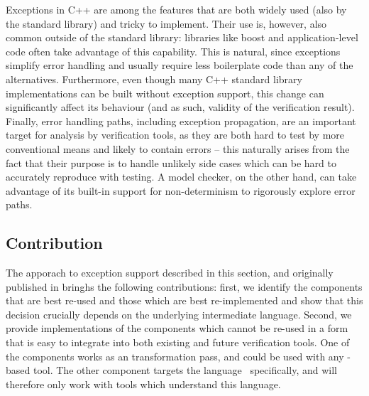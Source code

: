 Exceptions in C++ are among the features that are both widely used (also by the standard library) and tricky to implement.
Their use is, however, also common outside of the standard library: libraries
like boost
and application-level code often take advantage of this capability.
This is natural, since exceptions simplify error handling and usually require
less boilerplate code than any of the alternatives.
Furthermore, even though many C++ standard library implementations can
be built without exception support, this change can significantly affect its behaviour
(and as such, validity of the verification result).
Finally, error handling paths, including exception propagation, are an
important target for analysis by verification tools, as they are both hard to
test by more conventional means and likely to contain errors -- this naturally
arises from the fact that their purpose is to handle unlikely side cases which
can be hard to accurately reproduce with testing.
A model checker, on the other hand, can take advantage of its built-in support
for non-determinism to rigorously explore error paths.

\subsection{Contribution}\label{contribution}

The apporach to exception support described in this section, and originally published in  bringhs the following contributions:
first, we identify the
components that are best re-used and those which are best re-implemented
and show that this decision crucially depends on the underlying
intermediate language. Second, we provide implementations of the
components which cannot be re-used in a form that is easy to integrate
into both existing and future verification tools. One of the components
works as an \llvm{} transformation pass, and could be used with any
\llvm{}-based tool. The other component targets the \divm{}
language~ specifically, and will therefore only
work with tools which understand this language.

